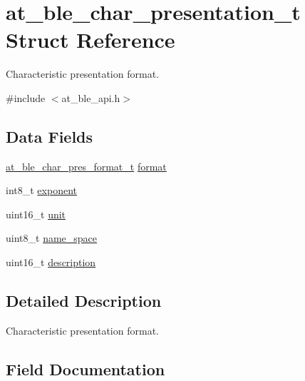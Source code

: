 \hypertarget{structat__ble__char__presentation__t}{}\section{at\+\_\+ble\+\_\+char\+\_\+presentation\+\_\+t Struct Reference}
\label{structat__ble__char__presentation__t}


Characteristic presentation format.  




{\ttfamily \#include $<$at\+\_\+ble\+\_\+api.\+h$>$}

\subsection*{Data Fields}
\begin{DoxyCompactItemize}
\item 
\mbox{\hyperlink{at__ble__api_8h_a4381d1d8b8350cd5072facd869783cca}{at\+\_\+ble\+\_\+char\+\_\+pres\+\_\+format\+\_\+t}} \mbox{\hyperlink{structat__ble__char__presentation__t_a7528bcf91fca4d39dc4a22703489e6a7}{format}}
\item 
int8\+\_\+t \mbox{\hyperlink{structat__ble__char__presentation__t_aed7f350cc5718140389c3dfe42a686b4}{exponent}}
\item 
uint16\+\_\+t \mbox{\hyperlink{structat__ble__char__presentation__t_a1e8ce93d382bc1a38b1d49f70acf0d24}{unit}}
\item 
uint8\+\_\+t \mbox{\hyperlink{structat__ble__char__presentation__t_aa1ae3a5a6c18293172edf891d5c33e58}{name\+\_\+space}}
\item 
uint16\+\_\+t \mbox{\hyperlink{structat__ble__char__presentation__t_aa07102ad6dbbb2a1b6eee0c3b13ce68e}{description}}
\end{DoxyCompactItemize}


\subsection{Detailed Description}
Characteristic presentation format. 

\subsection{Field Documentation}
\mbox{\label{structat__ble__char__presentation__t_aa07102ad6dbbb2a1b6eee0c3b13ce68e}} 
